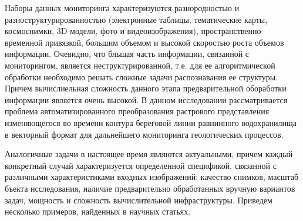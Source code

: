\documentclass[732,14pt,final]{studrep}
\begin{document}
Наборы данных мониторинга характеризуются разнородностью и разноструктурированностью (электронные таблицы, тематические карты, космоснимки, 3D-модели, фото и видеоизображения), пространственно-временной привязкой, большим объемом и высокой скоростью роста объемов информации. Очевидно, что бльшая часть информации, связанной с мониторингом, является неструктурированной, т.е. для ее алгоритмической обработки необходимо решать сложные задачи распознавания ее структуры. Причем вычислиельная сложность данного этапа предварительной обоработки информации является очень высокой.  В данном исследовании рассматривается проблема автоматизированного преобразования растрового представления изменяющегося во времени контура береговой линии равнинного водохранилища в векторный формат для дальнейшего мониторинга геологических процессов.

Аналогичные задачи в настоящее время являются актуальными, причем каждый конкретный случай характеризуется определенной спецификой, связанной с различными характеристиками входных изображений: качество снимков, масштаб бъекта исследования, наличие предварительно обработанных вручную вариантов задач, мощность и сложность вычислительной инфраструктуры. Приведем несколько примеров, найденных в научных статьях. 
\end{document}
